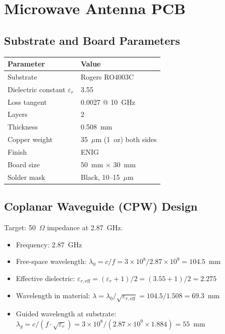 \documentclass[11pt,a4paper,openany]{book}
\begin{document}
\chapter{Microwave Antenna PCB}\label{ch:antenna}

\section{Substrate and Board Parameters}

\begin{center}
\begin{tabular}{ll}
\toprule
\textbf{Parameter} & \textbf{Value} \\
\midrule
Substrate & Rogers RO4003C \\
Dielectric constant $\varepsilon_r$ & 3.55 \\
Loss tangent & 0.0027 @ 10~GHz \\
Layers & 2 \\
Thickness & 0.508~mm \\
Copper weight & 35~$\mu$m (1~oz) both sides \\
Finish & ENIG \\
Board size & 50~mm $\times$ 30~mm \\
Solder mask & Black, 10--15~$\mu$m \\
\bottomrule
\end{tabular}
\end{center}

\section{Coplanar Waveguide (CPW) Design}

Target: 50~$\Omega$ impedance at 2.87~GHz.

\begin{itemize}[nosep]
  \item Frequency: 2.87~GHz
  \item Free-space wavelength: $\lambda_0 = c/f = 3 \times 10^8 / 2.87 \times 10^9 = 104.5$~mm
  \item Effective dielectric: $\varepsilon_{r,\text{eff}} = (\varepsilon_r + 1)/2 = (3.55 + 1)/2 = 2.275$
  \item Wavelength in material: $\lambda = \lambda_0 / \sqrt{\varepsilon_{r,\text{eff}}} = 104.5/1.508 = 69.3$~mm
  \item Guided wavelength at substrate: $\lambda_g = c/(f \cdot \sqrt{\varepsilon_r}) = 3 \times 10^8/(2.87 \times 10^9 \times 1.884) = 55$~mm
\end{itemize}
\end{document}
